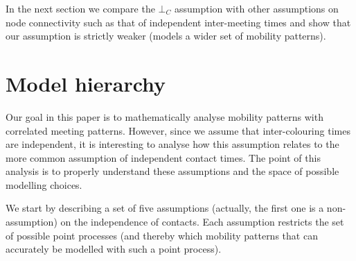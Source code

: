 \documentclass{article}
\begin{document}
In the next section we compare the $\bot_C$ assumption with other
assumptions on node connectivity such as that of independent
inter-meeting times and show that our assumption is strictly weaker
(models a wider set of mobility patterns).


\section{Model hierarchy}
\label{sec:hierarchy}
Our goal in this paper is to mathematically analyse mobility patterns
with correlated meeting patterns. However, since we assume that
inter-colouring times are independent, it is interesting to analyse
how this assumption relates to the more common assumption of
independent contact times. The point of this analysis is to properly
understand these assumptions and the space of possible modelling
choices.

We start by describing a set of five assumptions (actually, the first
one is a non-assumption) on the independence of contacts. Each
assumption restricts the set of possible point processes (and thereby
which mobility patterns that can accurately be modelled with such a
point process).
\end{document}

